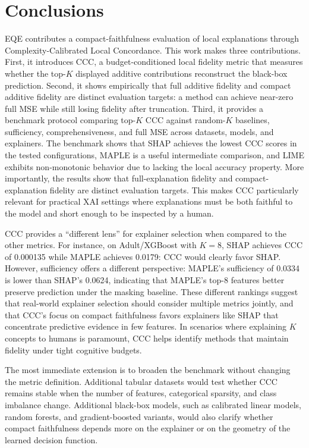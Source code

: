 \documentclass[sigconf,nonacm]{acmart}
\begin{document}
\section{Conclusions}
EQE contributes a compact-faithfulness evaluation of local explanations through
Complexity-Calibrated Local Concordance. This work makes three contributions.
First, it introduces CCC, a budget-conditioned local fidelity metric that measures
whether the top-$K$ displayed additive contributions reconstruct the black-box
prediction. Second, it shows empirically that full additive fidelity and compact
additive fidelity are distinct evaluation targets: a method can achieve near-zero
full MSE while still losing fidelity after truncation. Third, it provides a
benchmark protocol comparing top-$K$ CCC against random-$K$ baselines, sufficiency,
comprehensiveness, and full MSE across datasets, models, and explainers. The
benchmark shows that SHAP achieves the lowest CCC scores in the tested configurations,
MAPLE is a useful intermediate comparison, and LIME exhibits non-monotonic behavior
due to lacking the local accuracy property. More importantly, the results show that
full-explanation fidelity and compact-explanation fidelity are distinct evaluation
targets. This makes CCC particularly relevant for practical XAI settings where
explanations must be both faithful to the model and short enough to be inspected
by a human.

CCC provides a ``different lens'' for explainer selection when compared to the other
metrics. For instance, on Adult/XGBoost with $K=8$, SHAP achieves CCC of 0.000135
while MAPLE achieves 0.0179: CCC would clearly favor SHAP. However, sufficiency
offers a different perspective: MAPLE's sufficiency of 0.0334 is lower than SHAP's
0.0624, indicating that MAPLE's top-$8$ features better preserve prediction under
the masking baseline. These different rankings suggest that real-world explainer
selection should consider multiple metrics jointly, and that CCC's focus on compact
faithfulness favors explainers like SHAP that concentrate predictive evidence in
few features. In scenarios where explaining $K$ concepts to humans is paramount,
CCC helps identify methods that maintain fidelity under tight cognitive budgets.

The most immediate extension is to broaden the benchmark without changing the
metric definition. Additional tabular datasets would test whether CCC remains
stable when the number of features, categorical sparsity, and class imbalance
change. Additional black-box models, such as calibrated linear models, random
forests, and gradient-boosted variants, would also clarify whether compact
faithfulness depends more on the explainer or on the geometry of the learned
decision function.
\end{document}
